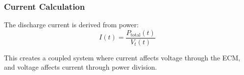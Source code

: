 \subsubsection{Current Calculation}

The discharge current is derived from power:
\begin{equation}
I(t) = \frac{P_{\text{total}}(t)}{V_t(t)}
\label{eq:current_from_power}
\end{equation}

This creates a coupled system where current affects voltage through the ECM, and voltage affects current through power division.
